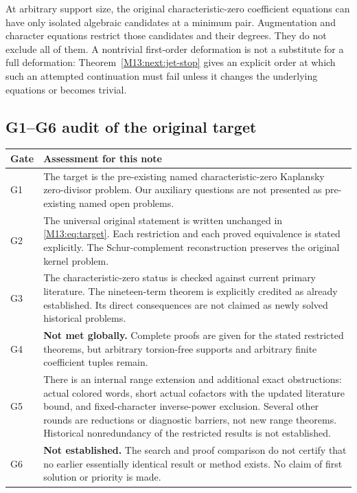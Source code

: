 \documentclass[11pt,a4paper,oneside]{report}
\theoremstyle{definition}
\theoremstyle{remark}
\begin{document}
At arbitrary support size, the original characteristic-zero
coefficient equations can have only isolated algebraic candidates
at a minimum pair. Augmentation and character equations restrict
those candidates and their degrees. They do not exclude all of
them. A nontrivial first-order deformation is not a substitute for
a full deformation: Theorem~\ref{M13:next:jet-stop} gives an explicit
order at which such an attempted continuation must fail unless it
changes the underlying equations or becomes trivial.

\subsection{G1--G6 audit of the original target}

\begin{center}
\small
\begin{tabular}{@{}l>{\raggedright\arraybackslash}p{.85\linewidth}@{}}
\toprule
Gate & Assessment for this note\\
\midrule
G1 & The target is the pre-existing named characteristic-zero
Kaplansky zero-divisor problem. Our auxiliary questions are not
presented as pre-existing named open problems.\\[5pt]
G2 & The universal original statement is written unchanged in
\eqref{M13:eq:target}. Each restriction and each proved equivalence is
stated explicitly. The Schur-complement reconstruction preserves
the original kernel problem.\\[5pt]
G3 & The characteristic-zero status is checked against current
primary literature. The nineteen-term theorem is explicitly
credited as already established. Its direct consequences are not
claimed as newly solved historical problems.\\[5pt]
G4 & \textbf{Not met globally.} Complete proofs are given for the
stated restricted theorems, but arbitrary torsion-free supports
and arbitrary finite coefficient tuples remain.\\[5pt]
G5 & There is an internal range extension and additional exact
obstructions: actual colored words, short actual cofactors with
the updated literature bound, and fixed-character inverse-power
exclusion. Several other rounds are reductions or diagnostic
barriers, not new range theorems. Historical nonredundancy of the
restricted results is not established.\\[5pt]
G6 & \textbf{Not established.} The search and proof comparison do
not certify that no earlier essentially identical result or method
exists. No claim of first solution or priority is made.\\
\bottomrule
\end{tabular}
\end{center}
\end{document}
